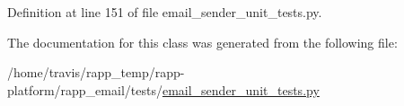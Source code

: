 Definition at line 151 of file email\-\_\-sender\-\_\-unit\-\_\-tests.\-py.



The documentation for this class was generated from the following file\-:\begin{DoxyCompactItemize}
\item 
/home/travis/rapp\-\_\-temp/rapp-\/platform/rapp\-\_\-email/tests/\hyperlink{email__sender__unit__tests_8py}{email\-\_\-sender\-\_\-unit\-\_\-tests.\-py}\end{DoxyCompactItemize}
